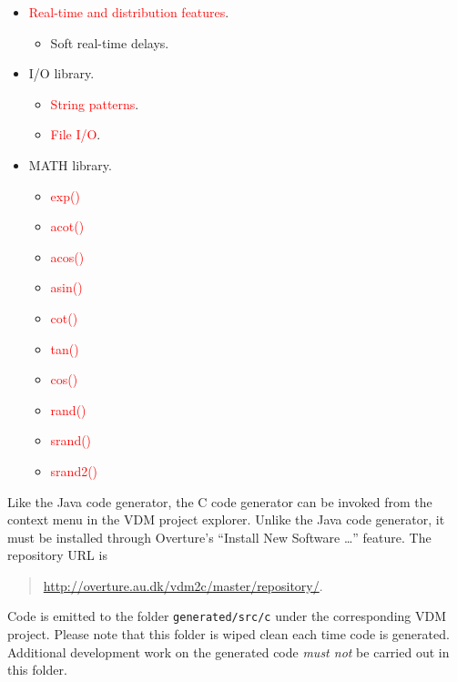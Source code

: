\begin{itemize}
%
\item  \textcolor{red}{Real-time and distribution features}.
\begin{itemize}
\item  Soft real-time delays.
\end{itemize}
%
\item  I/O library.
\begin{itemize}
\item  \textcolor{red}{String patterns}.
\item  \textcolor{red}{File I/O}.
\end{itemize}
%
\item MATH library.
\begin{itemize}
\item  \textcolor{red}{exp()}
\item  \textcolor{red}{acot()}
\item  \textcolor{red}{acos()}
\item  \textcolor{red}{asin()}
\item  \textcolor{red}{cot()}
\item  \textcolor{red}{tan()}
\item  \textcolor{red}{cos()}
\item  \textcolor{red}{rand()}
\item  \textcolor{red}{srand()}
\item  \textcolor{red}{srand2()}
\end{itemize}
%
\end{itemize}

Like the Java code generator, the C code generator can be invoked from the context menu in the VDM project explorer.
%
Unlike the Java code generator, it must be installed through Overture's ``Install New Software \dots'' feature.
%
The repository URL is
%
%
%
\begin{quote}
\url{http://overture.au.dk/vdm2c/master/repository/}.
\end{quote}
%
Code is emitted to the folder \texttt{generated/src/c} under the corresponding VDM project.
%
Please note that this folder is wiped clean each time code is generated.
%
Additional development work on the generated code \emph{must not} be carried out in this folder.
